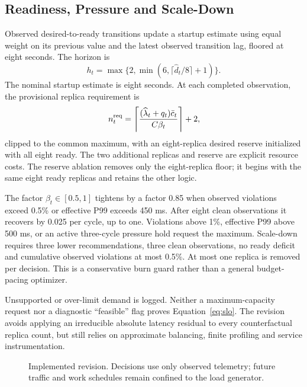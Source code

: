 \documentclass[10pt,twocolumn,a4paper]{article}
\begin{document}
\subsection{Readiness, Pressure and Scale-Down}
Observed desired-to-ready transitions update a startup estimate using equal weight on its previous value and the latest observed transition lag, floored at eight seconds. The horizon is
\begin{equation}h_t=\max\{2,\min(6,\lceil\widehat d_t/8\rceil+1)\}.\end{equation}
The nominal startup estimate is eight seconds. At each completed observation, the provisional replica requirement is
\begin{equation}n_t^{\rm req}=\left\lceil\frac{(\widehat\lambda_t+q_t)\bar c_t}{C\beta_t}\right\rceil+2,\label{eq:sizing}\end{equation}
clipped to the common maximum, with an eight-replica desired reserve initialized with all eight ready. The two additional replicas and reserve are explicit resource costs. The reserve ablation removes only the eight-replica floor; it begins with the same eight ready replicas and retains the other logic.

The factor $\beta_t\in[0.5,1]$ tightens by a factor 0.85 when observed violations exceed 0.5\% or effective P99 exceeds 450 ms. After eight clean observations it recovers by 0.025 per cycle, up to one. Violations above 1\%, effective P99 above 500 ms, or an active three-cycle pressure hold request the maximum. Scale-down requires three lower recommendations, three clean observations, no ready deficit and cumulative observed violations at most 0.5\%. At most one replica is removed per decision. This is a conservative burn guard rather than a general budget-pacing optimizer.

Unsupported or over-limit demand is logged. Neither a maximum-capacity request nor a diagnostic ``feasible'' flag proves Equation~\ref{eq:slo}. The revision avoids applying an irreducible absolute latency residual to every counterfactual replica count, but still relies on approximate balancing, finite profiling and service instrumentation.

\begin{figure}[t]\centering
{}
\caption{Implemented revision. Decisions use only observed telemetry; future traffic and work schedules remain confined to the load generator.}\label{fig:architecture}\end{figure}
\end{document}
